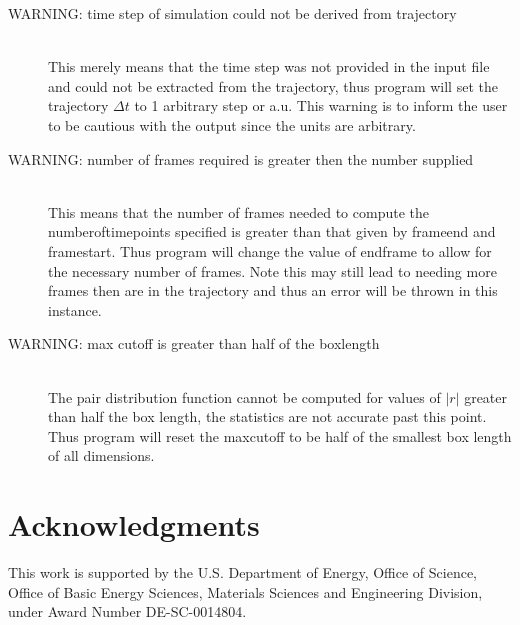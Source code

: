 \documentclass{article}
\begin{document}
\begin{description}
	\item[WARNING: time step of simulation could not be derived from trajectory] \hfill \\
	This merely means that the time step was not provided in the input file and could not be extracted from the trajectory, thus program will set the trajectory $\Delta t$ to 1 arbitrary step or a.u.  This warning is to inform the user to be cautious with the output since the units are arbitrary.
	
	\item[WARNING: number of frames required is greater then the number supplied] \hfill \\
	This means that the number of frames needed to compute the numberoftimepoints specified is greater than that given by frameend and framestart. Thus program will change the value of endframe to allow for the necessary number of frames.  Note this may still lead to needing more frames then are in the trajectory and thus an error will be thrown in this instance.
	
	\item[WARNING: max cutoff is greater than half of the boxlength] \hfill \\
	The pair distribution function cannot be computed for values of $|r|$ greater than half the box length, the statistics are not accurate past this point.  Thus program will reset the maxcutoff to be half of the smallest box length of all dimensions.
	
	
\end{description}

\section*{Acknowledgments}
This work is supported by the U.S. Department of Energy, Office of Science, Office of Basic Energy Sciences, Materials Sciences and Engineering Division, under Award Number DE-SC-0014804.



\end{document}
